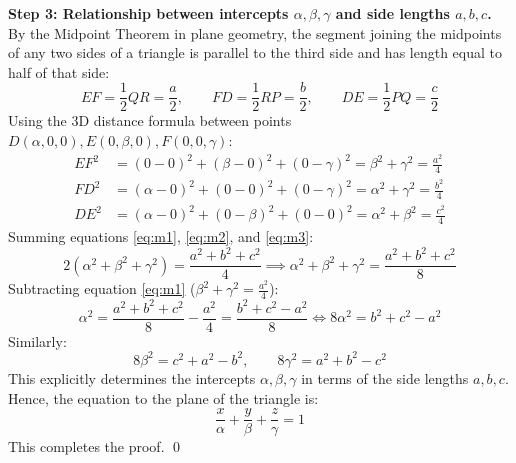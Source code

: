 \documentclass[11pt,a4paper]{article}
\begin{document}
\textbf{Step 3: Relationship between intercepts $\alpha, \beta, \gamma$ and side lengths $a, b, c$.}\\
By the Midpoint Theorem in plane geometry, the segment joining the midpoints of any two sides of a triangle is parallel to the third side and has length equal to half of that side:
$$EF = \frac{1}{2}QR = \frac{a}{2}, \qquad FD = \frac{1}{2}RP = \frac{b}{2}, \qquad DE = \frac{1}{2}PQ = \frac{c}{2}$$
Using the 3D distance formula between points $D(\alpha, 0, 0), E(0, \beta, 0), F(0, 0, \gamma)$:
\begin{align}
    EF^2 &= (0 - 0)^2 + (\beta - 0)^2 + (0 - \gamma)^2 = \beta^2 + \gamma^2 = \frac{a^2}{4} \label{eq:m1}\\
    FD^2 &= (\alpha - 0)^2 + (0 - 0)^2 + (0 - \gamma)^2 = \alpha^2 + \gamma^2 = \frac{b^2}{4} \label{eq:m2}\\
    DE^2 &= (\alpha - 0)^2 + (0 - \beta)^2 + (0 - 0)^2 = \alpha^2 + \beta^2 = \frac{c^2}{4} \label{eq:m3}
\end{align}
Summing equations \eqref{eq:m1}, \eqref{eq:m2}, and \eqref{eq:m3}:
$$2(\alpha^2 + \beta^2 + \gamma^2) = \frac{a^2 + b^2 + c^2}{4} \implies \alpha^2 + \beta^2 + \gamma^2 = \frac{a^2 + b^2 + c^2}{8}$$
Subtracting equation \eqref{eq:m1} ($\beta^2 + \gamma^2 = \frac{a^2}{4}$):
$$\alpha^2 = \frac{a^2 + b^2 + c^2}{8} - \frac{a^2}{4} = \frac{b^2 + c^2 - a^2}{8} \iff 8\alpha^2 = b^2 + c^2 - a^2$$
Similarly:
$$8\beta^2 = c^2 + a^2 - b^2, \qquad 8\gamma^2 = a^2 + b^2 - c^2$$
This explicitly determines the intercepts $\alpha, \beta, \gamma$ in terms of the side lengths $a, b, c$. Hence, the equation to the plane of the triangle is:
$$\frac{x}{\alpha} + \frac{y}{\beta} + \frac{z}{\gamma} = 1$$
This completes the proof. \qed

\begin{center}
\end{center}
\end{document}
